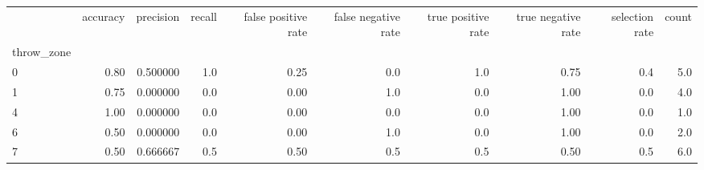\begin{tabular}{lrrrrrrrrr}
\toprule
{} &  accuracy &  precision &  recall &  false positive rate &  false negative rate &  true positive rate &  true negative rate &  selection rate &  count \\
throw\_zone &           &            &         &                      &                      &                     &                     &                 &        \\
\midrule
0          &      0.80 &   0.500000 &     1.0 &                 0.25 &                  0.0 &                 1.0 &                0.75 &             0.4 &    5.0 \\
1          &      0.75 &   0.000000 &     0.0 &                 0.00 &                  1.0 &                 0.0 &                1.00 &             0.0 &    4.0 \\
4          &      1.00 &   0.000000 &     0.0 &                 0.00 &                  0.0 &                 0.0 &                1.00 &             0.0 &    1.0 \\
6          &      0.50 &   0.000000 &     0.0 &                 0.00 &                  1.0 &                 0.0 &                1.00 &             0.0 &    2.0 \\
7          &      0.50 &   0.666667 &     0.5 &                 0.50 &                  0.5 &                 0.5 &                0.50 &             0.5 &    6.0 \\
\bottomrule
\end{tabular}
